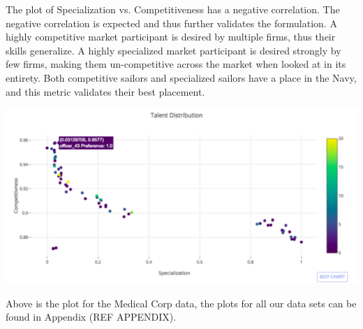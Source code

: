 The plot of Specialization vs. Competitiveness has a negative correlation. The negative correlation is expected and thus further validates the formulation.  A highly competitive market participant is desired by multiple firms, thus their skills generalize. A highly specialized market participant is desired strongly by few firms, making them un-competitive across the market when looked at in its entirety. Both competitive sailors and specialized sailors have a place in the Navy, and this metric validates their best placement. 

\begin{center}
\includegraphics[scale=0.75]{Sections/figures/med_comp_v_spec.png}
\end{center}

Above is the plot for the Medical Corp data, the plots for all our data sets can be found in Appendix (REF APPENDIX).